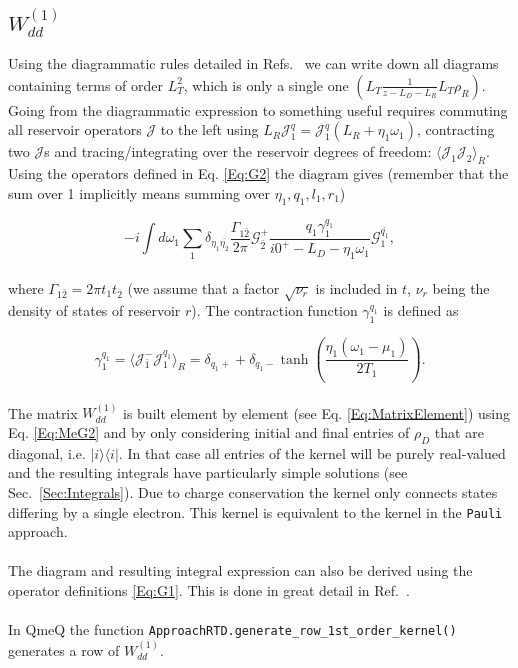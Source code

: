 \documentclass{article}
\newcommand{\oph}[2]{\ensuremath{|#1\rangle\langle#2|}}
\newcommand{\J}{\ensuremath{\mathcal{J}}}
\begin{document}
\subsection{$W^{(1)}_{dd}$}

Using the diagrammatic rules detailed in Refs.~\cite{leijnse2008kinetic, saptsov2012fermionic, gergs2017transport} we can write down all diagrams containing terms of order $L_T^2$, which is only a single one $\left( L_T\frac{1}{z-L_D-L_R}L_T\rho_R\right )$. Going from the diagrammatic expression to something useful requires commuting all reservoir operators $\mathcal{J}$ to the left using $L_R\J_1^q=\J_1^{q}(L_R+\eta_1\omega_1)$, contracting two $\mathcal{J}$s and tracing/integrating over the reservoir degrees of freedom: $\langle \mathcal{J}_1\mathcal{J}_2\rangle_R$. Using the operators defined in Eq. \ref{Eq:G2} the diagram gives (remember that the sum over 1 implicitly means summing over $\eta_1, q_1, l_1, r_1$) \cite{gergs2015charge, gergs2017transport, gergs2018spin}

\begin{equation}
    -i\int d\omega_1\sum_1 \delta_{\eta_1\bar{\eta_2}}\frac{\Gamma_{1\bar{2}}}{2\pi}\mathcal{G}_{\bar{2}}^+ \frac{q_1\gamma_1^{q_1}}{i0^+-L_D-\eta_1\omega_1}\mathcal{G}_{1}^{\bar{q_1}},
        \label{Eq:Wdd1}
\end{equation}
\\
where $\Gamma_{1\bar{2}} = 2\pi t_1t_{\bar{2}}$ (we assume that a factor $\sqrt{\nu_r}$ is included in $t$, $\nu_r$ being the density of states of reservoir $r$). The contraction function $\gamma_1^{q_1}$ is defined as 

\begin{equation}
    \gamma_1^{q_1} = \langle \J^-_{\bar{1}}\J^{q_1}_1\rangle_R = \delta_{q_1+} + \delta_{q_1-}\tanh\left ( \frac{\eta_1(\omega_1-\mu_1)}{2T_1} \right ).
\end{equation}
\\
The matrix $W^{(1)}_{dd}$ is built element by element (see Eq. \ref{Eq:MatrixElement}) using Eq. \ref{Eq:MeG2} and by only considering initial and final entries of $\rho_D$ that are diagonal, i.e. $\oph{i}{i}$. In that case all entries of the kernel will be purely real-valued  and the resulting integrals have particularly simple solutions (see Sec.~\ref{Sec:Integrals}). Due to charge conservation the kernel only connects states differing by a single electron. This kernel is equivalent to the kernel in the \verb!Pauli! approach. 
\\
\\
The diagram and resulting integral expression can also be derived using the operator definitions \ref{Eq:G1}. This is done in great detail in Ref.~\cite{leijnse2008kinetic}.
\\
\\
In QmeQ the function \verb!ApproachRTD.generate_row_1st_order_kernel()! generates a row of $W_{dd}^{(1)}$.
\end{document}
